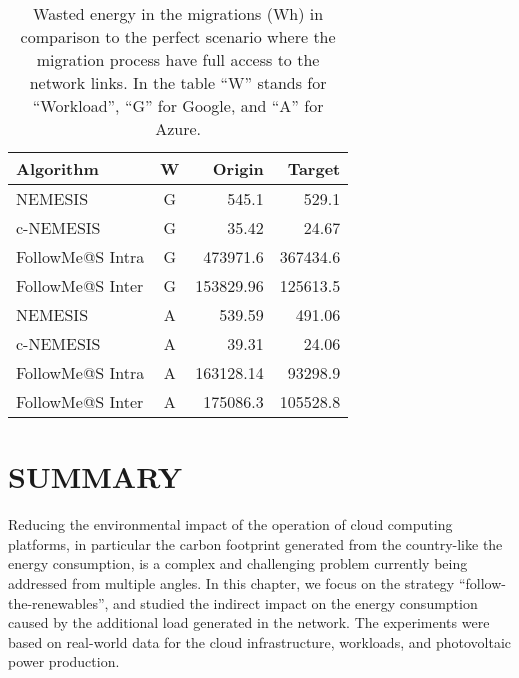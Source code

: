 \begin{table}[!ht]

\caption{Wasted energy in the migrations (Wh) in comparison to the perfect scenario where the migration process have full access to the network links. In the table ``W'' stands for ``Workload'', ``G'' for Google, and ``A'' for Azure.}\label{tab:wasted_mig} \centering
\begin{tabular}{|l|c|r|r|}
  \hline
  \textbf{Algorithm} & \textbf{W}  & \textbf{Origin} & \textbf{Target}   \\
  \hline
  NEMESIS  & G & 545.1  & 529.1 \\
  \hline
  c-NEMESIS & G & 35.42  & 24.67 \\
  \hline
  FollowMe@S Intra & G & 473971.6 & 367434.6 \\
  \hline
  FollowMe@S Inter & G & 153829.96  & 125613.5  \\
  \hline
  NEMESIS  & A & 539.59  & 491.06 \\
  \hline
  c-NEMESIS & A &  39.31 & 24.06   \\
  \hline
  FollowMe@S Intra & A & 163128.14  & 93298.9  \\
  \hline
  FollowMe@S Inter & A & 175086.3  & 105528.8 \\
  \hline

\end{tabular}
\end{table}


\section{\uppercase{Summary}} \label{sec:conclusion_smargreens}


Reducing the environmental impact of the operation of cloud computing platforms, in particular the carbon footprint generated from the country-like the energy consumption, is a complex and challenging problem currently being addressed from multiple angles. In this chapter, we focus on the strategy ``follow-the-renewables'', and studied the indirect impact on the energy consumption caused by the additional load generated in the network. The experiments were based on real-world data for the cloud infrastructure, workloads, and photovoltaic power production.

